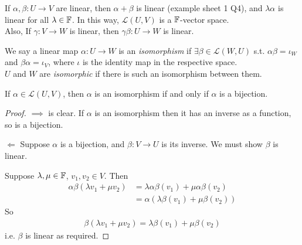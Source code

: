 \documentclass[a4paper]{article}
\begin{document}
\begin{eg}
If $\alpha,\beta: U \to V$ are linear, then $\alpha+\beta$ is linear (example sheet 1 Q4), and $\lambda \alpha$ is linear for all $\lambda \in \mathbb{F}$. In this way, $\mathcal{L} \left(U,V\right)$ is a $\mathbb{F}$-vector space.\\
Also, If $\gamma:V \to W$ is linear, then $\gamma\beta:U \to W$ is linear.
\end{eg}

\begin{defi}
We say a linear map $\alpha:U \to W$ is an \emph{isomorphism} if $\exists \beta \in \mathcal{L}\left(W,U\right)$ s.t. $\alpha\beta = \iota_W$ and $\beta\alpha = \iota_V$, where $\iota$ is the identity map in the respective space.\\
$U$ and $W$ are \emph{isomorphic} if there is such an isomorphism between them.
\end{defi}

\begin{lemma}
If $\alpha \in \mathcal{L} \left(U,V\right)$, then $\alpha$ is an isomorphism if and only if $\alpha$ is a bijection.
\begin{proof}
$\implies$ is clear. If $\alpha$ is an isomorphism then it has an inverse as a function, so is a bijection.

$\Longleftarrow$ Suppose $\alpha$ is a bijection, and $\beta: V \to U$ is its inverse. We must show $\beta$ is linear.

Suppose $\lambda,\mu \in \mathbb{F}$, $v_1,v_2 \in V$. Then
\begin{equation*}
\begin{aligned}
\alpha \beta\left(\lambda v_1 + \mu v_2\right) &= \lambda \alpha \beta\left(v_1\right) + \mu \alpha \beta\left(v_2\right)\\
&= \alpha\left(\lambda\beta\left(v_1\right) + \mu\beta\left(v_2\right)\right)
\end{aligned}
\end{equation*}
So
\begin{equation*}
\begin{aligned}
\beta\left(\lambda v_1+\mu v_2\right) = \lambda \beta\left(v_1\right)+\mu\beta\left(v_2\right)
\end{aligned}
\end{equation*}
i.e. $\beta$ is linear as required.
\end{proof}
\end{lemma}
\end{document}
